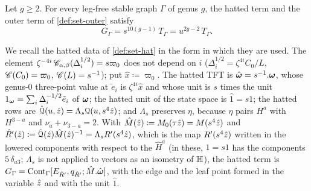 \begin{lem}[hatting]
\label{lem:flh-hat}
Let $g\geq 2$. For every leg-free stable graph $\Gamma$ of genus $g$, the hatted term and the outer term of \cref{def:set-outer} satisfy
\[
G_\Gamma=s^{10(g-1)}\,T_\Gamma=u^{2g-2}\,T_\Gamma .
\]
\end{lem}

We recall the hatted data of \cref{def:set-hat} in the form in which they are used. The element $\zeta^{-4i}\,\mathscr{C}_{\alpha,\beta}(\Delta_i^{1/2})=s\varpi_0$ does not depend on $i$ ($\Delta_i^{1/2}=\zeta^{4i}C_0/L$, $\mathscr{C}(C_0)=\varpi_0$, $\mathscr{C}(L)=s^{-1}$); put $\hat x\coloneqq\varpi_0$. The hatted TFT is $\hat{\boldsymbol{\omega}}=s^{-1}.\boldsymbol{\omega}$, whose genus-$0$ three-point value at $\tilde e_i$ is $\zeta^{4i}\hat x$ and whose unit is $s$ times the unit $1_{\boldsymbol{\omega}}=\sum_i\Delta_i^{-1/2}\tilde e_i$ of $\boldsymbol{\omega}$; the hatted unit of the state space is $\hat1=s1$; the hatted rows are $\hat{\mathcal{Q}}(u,\hat{z})=\Lambda_s\mathcal{Q}(u,s^4\hat{z})$; and $\Lambda_s$ preserves $\eta$, because $\eta$ pairs $H^a$ with $H^{3-a}$ and $\nu_a+\nu_{3-a}=2$. With $\hat M(\hat{z})\coloneqq M_{0}(\tau\hat{z})=M(s^4\hat{z})$ and $\hat R'(\hat{z})\coloneqq\hat{\mathcal{Q}}(\hat{z})\hat M(\hat{z})^{-1}=\Lambda_sR'(s^4\hat{z})$, which is the map $R'(s^4\hat{z})$ written in the lowered components with respect to the $\hat H^a$ (in these, $\hat1=s1$ has the components $5\,\delta_{a3}$; $\Lambda_s$ is not applied to vectors as an isometry of $\mathbb{H}$), the hatted term is $G_\Gamma=\mathrm{Cont}_\Gamma[E_{\hat R'},q_{\hat R'};\hat M.\hat{\boldsymbol{\omega}}]$, with the edge and the leaf point formed in the variable $\hat{z}$ and with the unit $\hat1$.

